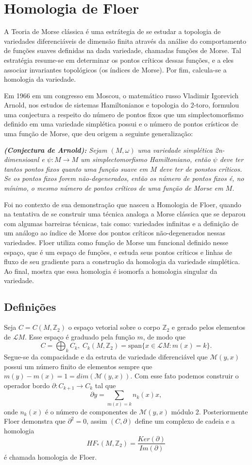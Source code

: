 \documentclass[12pt]{book}
\newcommand{\inteiros}{\mathbb{Z}}
\newcommand{\lacocontrateis}{\mathcal{L}M}
\begin{document}
	
	\chapter{Homologia de Floer}
	A Teoria de Morse clássica é uma estrátegia de se estudar a topologia de variedades diferenciáveis de dimensão finita através da análise do comportamento de funções suaves definidas na dada variedade, chamadas funções de Morse. Tal estratégia resume-se em determinar os pontos críticos dessas funções, e a eles associar invariantes topológicos (os índices de Morse). Por fim, calcula-se a homologia da variedade.
	
	Em 1966 em um congresso em Moscou, o matemático russo Vladimir Igorevich Arnold, nos estudos de sistemas Hamiltonianos e topologia do 2-toro, formulou uma conjectura a respeito do número de pontos fixos que um simplectomorfismo definido em uma variedade simplética possui e o número de pontos crísticos de uma função de Morse, que deu origem a seguinte generalização:
	
	\textit{\textbf{(Conjectura de Arnold):} Sejam $(M, \omega)$ uma variedade simplética 2n-dimensioanl e $\psi : M \to M $ um simplectomorfismo Hamiltoniano, então $\psi$ deve ter tantos pontos fixos quanto uma função suave em $M$ deve ter de ponstos críticos. Se os pontos fixos forem não-degenerados, então os número de pontos fixos é, no mínimo, o mesmo número de pontos críticos de uma função de Morse em $M$.}
	
	Foi no contexto de sua demonstração que nasceu a Homologia de Floer, quando na tentativa de se construir uma técnica analoga a  Morse clássica que se deparou com algumas barreiras técnicas, tais como: variedades infinitas e a definição de um análogo ao índice de Morse dos pontos críticos não-degenerados nessas variedades. Floer utiliza como função de Morse um funcional definido nesse espaço, que é um espaço de funções, e estuda seus pontos críticos e linhas de fluxo de seu gradiente para a construção da homologia da variedade simplética. Ao final, mostra que essa homologia é isomorfa a homologia singular da variedade.
	
	\section{Definições}
	Seja $C = C(M, \inteiros_{2})$ o espaço vetorial sobre o corpo $\inteiros_{2}$ e gerado pelos elementos de $\lacocontrateis$. Esse espaço é graduado pela função $m$, de modo que
	$$
	C = \bigoplus_{k}C_{k}, \; C_{k}(M, \inteiros_{2}) = \text{span}\{x \in \lacocontrateis:m(x)=k \}.
	$$
	Segue-se da compacidade e da estruta de variedade diferenciável que $\mathcal{M}(y,x)$ possui um número finito de elementos sempre que $ m(y)-m(x)=1 = dim(\mathcal{M}(y,x))$. Com esse fato podemos construir o operador bordo $\partial : C_{k+1} \to C_{k}$ tal que
	$$
	\partial y = \sum_{m(x)=k} n_{k}(x) x,	
	$$
	onde $n_{k}(x)$ é o número de componentes de $\mathcal{M}(y,x)$ módulo 2. Posteriormente Floer demonstra que $\partial^{2}=0$, assim $(C,\partial)$ define um complexo de cadeia e a homologia
	$$
	HF_{*}(M, \inteiros_{2}) = \frac{Ker(\partial)}{Im(\partial)}
	$$
	é chamada homologia de Floer.
	
\end{document}
